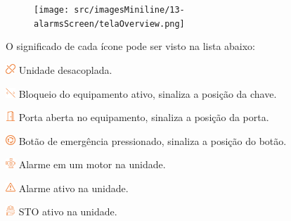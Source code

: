 \begin{figure}[h]
    \centering
    \texttt{[image: src/imagesMiniline/13-alarmsScreen/telaOverview.png]}
  \end{figure}

O significado de cada ícone pode ser visto na lista abaixo:


\begin{alarmIcons}

\item[\ding{\dingNumber}] \includegraphics[height=1em]{src/imagesICV/13-alarmsScreen/overview/disconnect-orange.png} Unidade desacoplada.
\item[\ding{\dingNumber}] \includegraphics[height=1em]{src/imagesICV/13-alarmsScreen/overview/don't-move-orange.png} Bloqueio do equipamento ativo, sinaliza a posição da chave.
\item[\ding{\dingNumber}] \includegraphics[height=1em]{src/imagesICV/13-alarmsScreen/overview/door-open-orange.png} Porta aberta no equipamento, sinaliza a posição da porta.
\item[\ding{\dingNumber}] \includegraphics[height=1em]{src/imagesICV/13-alarmsScreen/overview/emergency-stop-orange.png} Botão de emergência pressionado, sinaliza a posição do botão.
\item[\ding{\dingNumber}] \includegraphics[height=1em]{src/imagesICV/13-alarmsScreen/overview/engine-orange.png} Alarme em um motor na unidade.
\item[\ding{\dingNumber}] \includegraphics[height=1em]{src/imagesICV/13-alarmsScreen/overview/exclamation-triangle-orange.png} Alarme ativo na unidade.
\item[\ding{\dingNumber}] \includegraphics[height=1em]{src/imagesICV/13-alarmsScreen/overview/helmet-orange.png} STO ativo na unidade.

\end{alarmIcons}
